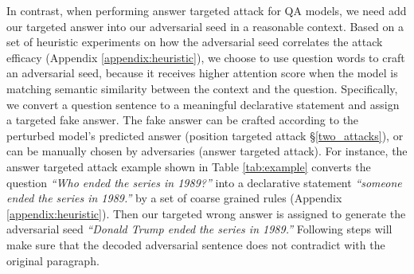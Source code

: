 In contrast, when performing answer targeted attack for QA models, we need add our targeted answer into our adversarial seed in a reasonable context.  Based on a set of heuristic experiments on how the adversarial seed correlates the attack efficacy (Appendix \ref{appendix:heuristic}), we choose to use question words to craft an adversarial seed, because it receives higher attention score when the model is matching semantic similarity between the context and the question. 
Specifically, we convert a question sentence to a meaningful declarative statement and assign a targeted fake answer. The fake answer can be crafted according to the perturbed model's predicted answer (position targeted attack \S \ref{two_attacks}), or can be manually chosen by adversaries (answer targeted attack). For instance, the answer targeted attack example shown in Table \ref{tab:example} converts the question \textit{``Who ended the series in 1989?''} into a declarative statement \textit{``someone ended the series in 1989.''} by a set of coarse grained rules (Appendix \ref{appendix:heuristic}).
Then our targeted wrong answer is assigned to generate the adversarial seed \textit{``Donald Trump ended the series in 1989.''}  Following steps will make sure that the decoded adversarial sentence does not contradict with the original paragraph. 

 


